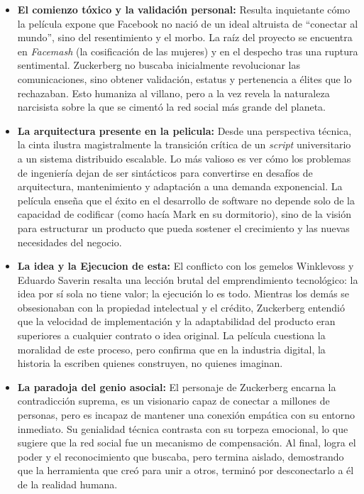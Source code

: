 \documentclass{./plantilla/umss}
\begin{document}
\begin{itemize}
  \item \textbf{El comienzo tóxico y la validación personal:} 
        Resulta inquietante cómo la película expone que Facebook no nació de un ideal altruista de ``conectar al mundo'', sino del resentimiento y el morbo. La raíz del proyecto se encuentra en \textit{Facemash} (la cosificación de las mujeres) y en el despecho tras una ruptura sentimental. Zuckerberg no buscaba inicialmente revolucionar las comunicaciones, sino obtener validación, estatus y pertenencia a élites que lo rechazaban. Esto humaniza al villano, pero a la vez revela la naturaleza narcisista sobre la que se cimentó la red social más grande del planeta.

  \item \textbf{La arquitectura presente en la pelicula:} 
        Desde una perspectiva técnica, la cinta ilustra magistralmente la transición crítica de un \textit{script} universitario a un sistema distribuido escalable. Lo más valioso es ver cómo los problemas de ingeniería dejan de ser sintácticos para convertirse en desafíos de arquitectura, mantenimiento y adaptación a una demanda exponencial. La película enseña que el éxito en el desarrollo de software no depende solo de la capacidad de codificar (como hacía Mark en su dormitorio), sino de la visión para estructurar un producto que pueda sostener el crecimiento y las nuevas necesidades del negocio.

  \item \textbf{La idea y la Ejecucion de esta:} 
        El conflicto con los gemelos Winklevoss y Eduardo Saverin resalta una lección brutal del emprendimiento tecnológico: la idea por sí sola no tiene valor; la ejecución lo es todo. Mientras los demás se obsesionaban con la propiedad intelectual y el crédito, Zuckerberg entendió que la velocidad de implementación y la adaptabilidad del producto eran superiores a cualquier contrato o idea original. La película cuestiona la moralidad de este proceso, pero confirma que en la industria digital, la historia la escriben quienes construyen, no quienes imaginan.

  \item \textbf{La paradoja del genio asocial:} 
        El personaje de Zuckerberg encarna la contradicción suprema, es un visionario capaz de conectar a millones de personas, pero es incapaz de mantener una conexión empática con su entorno inmediato. Su genialidad técnica contrasta con su torpeza emocional, lo que sugiere que la red social fue un mecanismo de compensación. Al final, logra el poder y el reconocimiento que buscaba, pero termina aislado, demostrando que la herramienta que creó para unir a otros, terminó por desconectarlo a él de la realidad humana.


\end{itemize}
\end{document}
